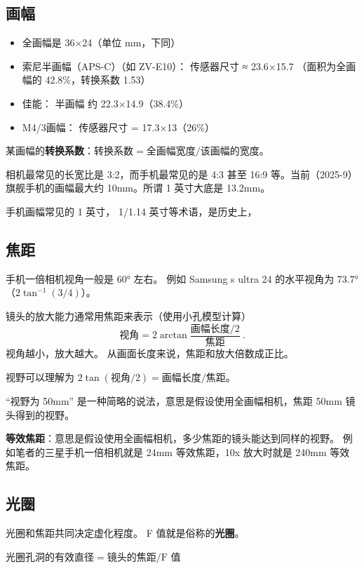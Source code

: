 
\subsection{画幅}
\begin{itemize}
\item 全画幅是 36×24（单位 mm，下同）
\item 索尼半画幅（APS-C）（如 ZV-E10）： 传感器尺寸 ≈ 23.6×15.7 （面积为全画幅的 42.8\%，转换系数 1.53）
\item 佳能： 半画幅 约 22.3×14.9（38.4\%）
\item M4/3画幅： 传感器尺寸 = 17.3×13（26\%）
\end{itemize}

某画幅的\textbf{转换系数}：$\text{转换系数} = \text{全画幅宽度}/\text{该画幅的宽度}$。

相机最常见的长宽比是 3:2，而手机最常见的是 4:3 甚至 16:9 等。当前（2025-9）旗舰手机的画幅最大约 10mm。所谓 1 英寸大底是 13.2mm。

手机画幅常见的 1 英寸， 1/1.14 英寸等术语，是历史上，

\subsection{焦距}
手机一倍相机视角一般是 60° 左右。 例如 Samsung s ultra 24 的水平视角为 73.7°（$2\tan^{-1}(3/4)$）。

镜头的放大能力通常用焦距来表示（使用小孔模型计算）
\begin{equation}
\text{视角} = 2\arctan{\frac{\text{画幅长度/2}}{\text{焦距}}}~.
\end{equation}
视角越小，放大越大。 从画面长度来说，焦距和放大倍数成正比。

视野可以理解为 $2\tan(\text{视角}/2) = \text{画幅长度}/{\text{焦距}}$。

“视野为 50mm” 是一种简略的说法，意思是假设使用全画幅相机，焦距 50mm 镜头得到的视野。

\textbf{等效焦距}：意思是假设使用全画幅相机，多少焦距的镜头能达到同样的视野。 例如笔者的三星手机一倍相机就是 24mm 等效焦距，10x 放大时就是 240mm 等效焦距。


\subsection{光圈}
光圈和焦距共同决定虚化程度。 F 值就是俗称的\textbf{光圈}。

$\text{光圈孔洞的有效直径} = \text{镜头的焦距}/\text{F 值}$

